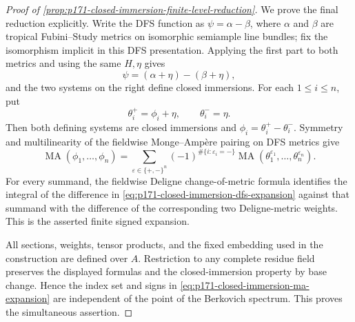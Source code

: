 \begin{proof}[Proof of
\cref{prop:p171-closed-immersion-finite-level-reduction}]
We prove the final reduction explicitly.  Write the DFS function as
\(\psi=\alpha-\beta\), where \(\alpha\) and \(\beta\) are tropical
Fubini--Study metrics on isomorphic semiample line bundles; fix the
isomorphism implicit in this DFS presentation.  Applying the first part to
both metrics and using the same \(H,\eta\) gives
\begin{equation}
\label{eq:p171-closed-immersion-dfs-expansion}
                    \psi=(\alpha+\eta)-(\beta+\eta),
\end{equation}
and the two systems on the right define closed immersions.  For each
\(1\leq i\leq n\), put
\[
                  \theta_i^+=\phi_i+\eta,
                  \qquad \theta_i^-=\eta.
\]
Then both defining systems are closed immersions and
\(\phi_i=\theta_i^+-\theta_i^-\).  Symmetry and multilinearity of the
fieldwise Monge--Amp\`ere pairing on DFS metrics give
\begin{equation}
\label{eq:p171-closed-immersion-ma-expansion}
 \operatorname{MA}(\phi_1,\ldots,\phi_n)
 =\sum_{\varepsilon\in\{+,-\}^n}
   (-1)^{\#\{i:\varepsilon_i=-\}}
   \operatorname{MA}(\theta_1^{\varepsilon_1},\ldots,
                     \theta_n^{\varepsilon_n}).
\end{equation}
For every summand, the fieldwise Deligne change-of-metric formula identifies
the integral of the difference in
\eqref{eq:p171-closed-immersion-dfs-expansion} against that summand with
the difference of the corresponding two Deligne-metric weights.  This is
the asserted finite signed expansion.

All sections, weights, tensor products, and the fixed embedding used in
the construction are defined over \(A\).  Restriction to any complete
residue field preserves the displayed formulas and the closed-immersion
property by base change.  Hence the index set and signs in
\eqref{eq:p171-closed-immersion-ma-expansion} are independent of the point
of the Berkovich spectrum.  This proves the simultaneous assertion.
\end{proof}
